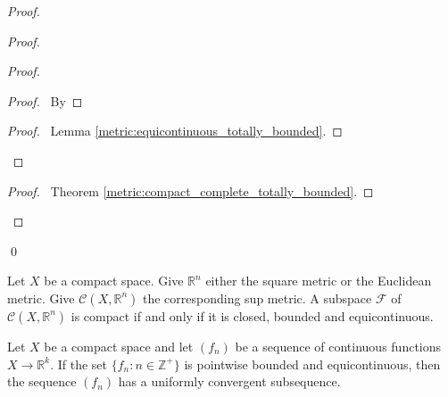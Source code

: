\begin{proof}
\begin{proof}
\begin{proof}
      \begin{proof}
        \pf\ By 
      \end{proof}
      \qedstep
      \begin{proof}
        \pf\ Lemma \ref{metric:equicontinuous_totally_bounded}.
      \end{proof}
    \end{proof}
    \qedstep
    \begin{proof}
      \pf\ Theorem \ref{metric:compact_complete_totally_bounded}.
    \end{proof}
  \end{proof}
  \qed
\end{proof}

\begin{cor}
  Let $X$ be a compact space. Give $\mathbb{R}^n$ either the square metric or the Euclidean metric. Give $\mathcal{C}(X, \mathbb{R}^n)$ the corresponding sup metric. A subspace $\mathcal{F}$ of $\mathcal{C}(X, \mathbb{R}^n)$ is compact if and only if it is closed, bounded and equicontinuous.
\end{cor}

\begin{cor}
  Let $X$ be a compact space and let $(f_n)$ be a sequence of continuous functions $X \rightarrow \mathbb{R}^k$. If the set $\{ f_n : n \in \mathbb{Z}^+ \}$ is pointwise bounded and equicontinuous, then the sequence $(f_n)$ has a uniformly convergent subsequence.
\end{cor}
